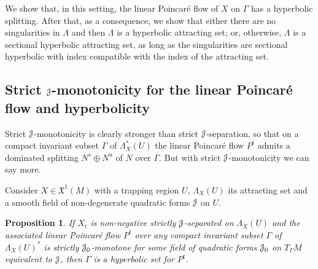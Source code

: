 \documentclass[12pt,reqno]{amsart}
\numberwithin{equation}{section}
\theoremstyle{plain}
\newtheorem{proposition}[theorem]{Proposition}
\theoremstyle{definition}
\newcommand{\J}{\EuScript{J}}
\newcommand{\Mundo}{\mathfrak{X}^{1}(M)}
\begin{document}
We show that, in this setting, the linear Poincar\'e flow of
$X$ on $\Gamma$ has a hyperbolic splitting. After that, as a
consequence, we show that either there are no singularities
in $\Lambda$ and then $\Lambda$ is a hyperbolic attracting
set; or, otherwise, $\Lambda$ is a sectional hyperbolic
attracting set, as long as the singularities are sectional
hyperbolic with index compatible with the index of the
attracting set.

\subsection{Strict $\J$-monotonicity for the linear Poincar\'e
  flow and hyperbolicity}
\label{sec:j-monoton-linear-1}

Strict $\J$-monotonicity is clearly stronger than strict
$\J$-separation, so that on a compact invariant subset
$\Gamma$ of $\Lambda^*_X(U)$ the linear Poincar\'e flow
$P^t$ admits a dominated splitting $N^s\oplus N^u$ of $N$
over $\Gamma$. But with strict $\J$-monotonicity we can say
more.

Consider $X\in\Mundo$ with a trapping region $U$,
$\Lambda_X(U)$ its attracting set and a smooth field
of non-degenerate quadratic forms $\J$ on $U$.
\begin{proposition}
  \label{pr:J-monot-hyperb}
  If $X_t$ is non-negative strictly $\J$-separated on
  $\Lambda_X(U)$ and the associated linear Poincar\'e flow
  $P^t$ over any compact invariant subset $\Gamma$ of
  $\Lambda_X(U)^*$ is strictly $\J_0$-monotone for some
  field of quadratic forms $\J_0$ on $T_\Gamma M$
  equivalent to $\J$, then $\Gamma$ is a hyperbolic set for
  $P^t$.
\end{proposition}
\end{document}
